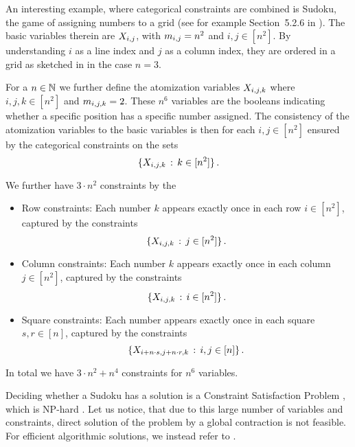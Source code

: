 \begin{example}[Sudoku]
    \label{exa:sudoku}
    An interesting example, where categorical constraints are combined is Sudoku, the game of assigning numbers to a grid (see for example Section~5.2.6 in \cite{russell_artificial_2021}).
    The basic variables therein are $X_{i,j}$, with $m_{i,j}=n^2$ and $i,j\in[n^2]$.
    By understanding $i$ as a line index and $j$ as a column index, they are ordered in a grid as sketched in  in the case $n=3$.

    For a $n\in\mathbb{N}$ we further define the atomization variables $X_{i,j,k}$ where $i,j,k\in[n^2]$ and $m_{i,j,k}=2$.
    These $n^6$ variables are the booleans indicating whether a specific position has a specific number assigned.
    The consistency of the atomization variables to the basic variables is then for each $i,j\in[n^2]$ ensured by the categorical constraints on the sets
    \[ \{X_{i,j,k} \,:\, k\in [n^2] \} \, . \]

    We further have $3\cdot n^2$ constraints by the
    \begin{itemize}
        \item Row constraints: Each number $k$ appears exactly once in each row $i\in[n^2]$, captured by the constraints
        \[ \{X_{i,j,k}  \,:\, j \in [n^2] \} \, . \]
        \item Column constraints: Each number $k$ appears exactly once in each column $j\in[n^2]$, captured by the constraints
        \[ \{X_{i,j,k}  \,:\, i \in [n^2] \} \, . \]
        \item Square constraints: Each number appears exactly once in each square $s,r\in[n]$, captured by the constraints
        \[ \{X_{i+n\cdot s,j+n\cdot r,k}  \,:\, i,j \in [n] \} \, . \]
    \end{itemize}

    In total we have $3\cdot n^2 + n^4$ constraints for $n^6$ variables.

    Deciding whether a Sudoku has a solution is a Constraint Satisfaction Problem \cite{simonis_sudoku_2005}, which is NP-hard \cite{agerbeck_multi-agent_2008}.
    Let us notice, that due to this large number of variables and constraints, direct solution of the problem by a global contraction is not feasible.
    For efficient algorithmic solutions, we instead refer to .


\end{example}
